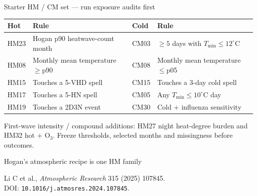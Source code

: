 \begin{frame}{Starter HM / CM set --- run exposure audits first}
  \scriptsize
  \renewcommand{\arraystretch}{1.12}
  \begin{tabular}{@{}p{}p{}p{}p{}@{}}
    \toprule
    \textbf{Hot} & \textbf{Rule} & \textbf{Cold} & \textbf{Rule} \\
    \midrule
    HM23 & Hogan p90 heatwave-count month & CM03 & $\geq5$ days with $T_{\min}\leq12^\circ$C \\
    HM08 & Monthly mean temperature $\geq$p90 & CM08 & Monthly mean temperature $\leq$p05 \\
    HM15 & Touches a 5-VHD spell & CM15 & Touches a 3-day cold spell \\
    HM17 & Touches a 5-HN spell & CM05 & Any $T_{\min}\leq10^\circ$C day \\
    HM19 & Touches a 2D3N event & CM30 & Cold $+$ influenza sensitivity \\
    \bottomrule
  \end{tabular}

  \vspace{0.55em}
  \footnotesize
  First-wave intensity / compound additions: HM27 night heat-degree burden and
  HM32 hot $+$ O$_3$. Freeze thresholds, selected months and missingness before outcomes.
\end{frame}

\begin{frame}{Hogan's atmospheric recipe is one HM family}
  \footnotesize
  \begin{center}
  \end{center}

  \vspace{0.55em}
  Li C et al., \emph{Atmospheric Research} 315 (2025) 107845.\\
  DOI: \texttt{10.1016/j.atmosres.2024.107845}.

  \vspace{0.35em}
\end{frame}

